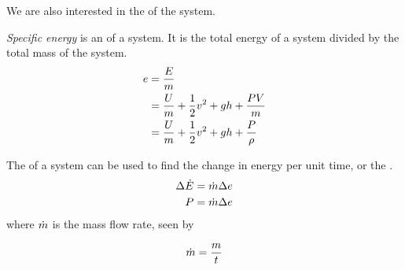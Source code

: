 We are also interested in the  of the system.
\begin{definition}\label{def:Specific_Energy}
  \emph{Specific energy} is an  of a system.
  It is the total energy of a system divided by the total mass of the system.
  \begin{equation}\label{eq:Specific_Energy}
    \begin{aligned}
      e &= \frac{E}{m} \\
      &= \frac{U}{m} + \frac{1}{2} v^{2} + g h + \frac{P V}{m} \\
      &= \frac{U}{m} + \frac{1}{2} v^{2} + g h + \frac{P}{\rho} \\
    \end{aligned}
  \end{equation}
\end{definition}

The  of a system can be used to find the change in energy per unit time, or the .
\begin{equation}\label{eq:Energy_Flow_Rate}
  \begin{aligned}
    \Delta \dot{E} &= \dot{m} \Delta e \\
    P &= \dot{m} \Delta e \\
  \end{aligned}
\end{equation}
where $\dot{m}$ is the mass flow rate, seen by 

\begin{equation}\label{eq:Mass_Flow_Rate}
  \dot{m} = \frac{m}{t}
\end{equation}


